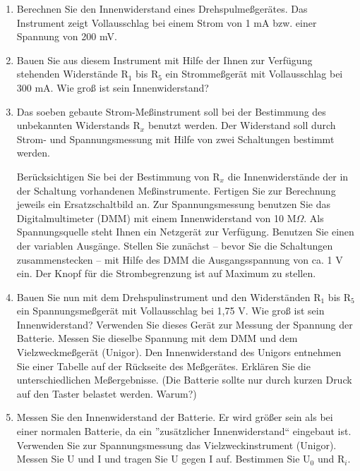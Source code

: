\documentclass[12pt]{scrartcl}
\begin{document}
\begin{enumerate}

	\item 
	Berechnen Sie den Innenwiderstand 				eines Drehspulmeßgerätes. Das Instrument
	zeigt Vollausschlag bei einem Strom von 			1 mA bzw. einer Spannung von 200 mV.
	\item
	Bauen Sie aus diesem Instrument mit 				Hilfe der Ihnen zur Verfügung stehenden 			Widerstände $\text{R}_1$ bis 					$\text{R}_5$ ein 								Strommeßgerät mit Vollausschlag bei 300 			mA. Wie groß ist sein Innenwiderstand?
	\item
	Das soeben gebaute Strom-Meßinstrument 			soll bei der Bestimmung des unbekannten 			Widerstands $\text{R}_x$ benutzt werden. 	Der Widerstand soll durch Strom- und 			Spannungsmessung mit Hilfe von zwei 				Schaltungen bestimmt werden.
	
	
	Berücksichtigen Sie bei 	der Bestimmung 			von $\text{R}_x$ die Innenwiderstände 			der in der Schaltung vorhandenen 				Meßinstrumente. Fertigen Sie zur 				Berechnung jeweils ein Ersatzschaltbild 			an. Zur Spannungsmessung benutzen Sie 			das Digitalmultimeter (DMM) mit einem 			Innenwiderstand von 10 M$\Omega$. Als 			Spannungsquelle steht Ihnen ein 					Netzgerät zur Verfügung. Benutzen Sie 			einen der variablen Ausgänge. Stellen 			Sie zunächst -- bevor Sie die 					Schaltungen 	zusammenstecken -- mit Hilfe 	des DMM die Ausgangsspannung von ca. 			1 V ein. Der Knopf für die 						Strombegrenzung ist auf Maximum zu 				stellen.
	\item
	Bauen Sie nun mit dem Drehspulinstrument 	und den Widerständen $\text{R}_1$ bis 			$\text{R}_5$ ein Spannungsmeßgerät mit 			Vollausschlag bei 1,75 V. Wie groß ist 			sein Innenwiderstand? Verwenden Sie 				dieses Gerät zur Messung der Spannung 			der Batterie. Messen Sie dieselbe 				Spannung mit dem DMM und dem 					Vielzweckmeßgerät (Unigor). Den 					Innenwiderstand des Unigors entnehmen 			Sie einer Tabelle auf der Rückseite des 			Meßgerätes. Erklären Sie die 					unterschiedlichen Meßergebnisse.
	(Die Batterie sollte nur durch 					kurzen Druck auf den Taster belastet 			werden. Warum?)
	\item
	Messen Sie den Innenwiderstand der 				Batterie. Er wird größer sein als bei 			einer normalen Batterie, da ein 					”zusätzlicher Innenwiderstand“ eingebaut 	ist. Verwenden Sie zur Spannungsmessung 			das Vielzweckinstrument (Unigor). Messen 	Sie U und I und tragen Sie U gegen I 			auf. Bestimmen Sie $\text{U}_0$ und 				$\text{R}_i$.
	

\end{enumerate}
\end{document}
